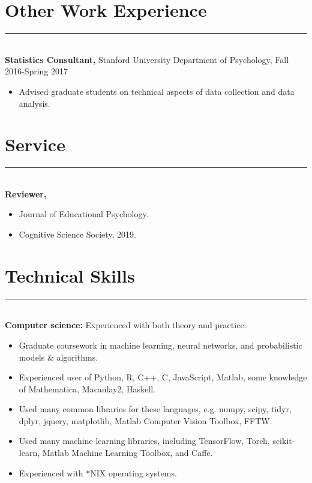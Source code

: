 \documentclass[margin]{res}
\begin{document}
\begin{resume}
\vspace{1pt}\section{Other Work Experience} \vspace{-15pt} \rule{\textwidth}{0.5pt} \\[3pt]
{\bf Statistics Consultant,} Stanford University Department of Psychology, Fall 2016-Spring 2017
\begin{itemize} \itemsep -2pt
 \item Advised graduate students on technical aspects of data collection and data analysis. \end{itemize}
\vspace{1pt}\section{Service} \vspace{-15pt} \rule{\textwidth}{0.5pt} \\[3pt]
{\bf Reviewer,} 
\begin{itemize} \itemsep -2pt
 \item Journal of Educational Psychology.
 \item Cognitive Science Society, 2019.\end{itemize}
\vspace{1pt}\section{Technical Skills} \vspace{-15pt} \rule{\textwidth}{0.5pt} \\[3pt]
{\bf Computer science:} Experienced with both theory and practice. 
\begin{itemize} \itemsep -2pt
  \item Graduate coursework in machine learning, neural networks, and probabilistic models \& algorithms.
  \item Experienced user of Python, R, C++, C, JavaScript, Matlab, some knowledge of Mathematica, Macaulay2, Haskell. 
  \item Used many common libraries for these languages, e.g. numpy, scipy, tidyr, dplyr, jquery, matplotlib, Matlab Computer Vision Toolbox, FFTW.
  \item Used many machine learning libraries, including TensorFlow, Torch, scikit-learn, Matlab Machine Learning Toolbox, and Caffe.
  \item Experienced with *NIX operating systems.

\end{itemize}
\end{resume}
\end{document}
